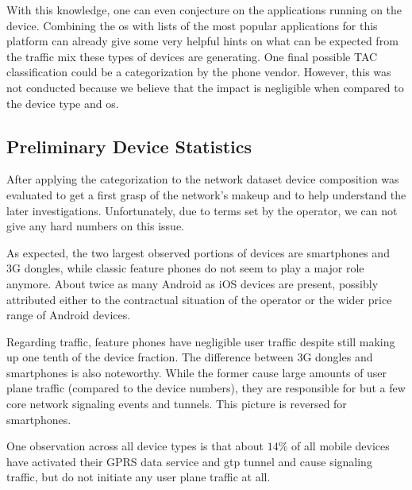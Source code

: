 With this knowledge, one can even conjecture on the applications running on the device. Combining the \gls{os} with lists of the most popular applications for this platform can already give some very helpful hints on what can be expected from the traffic mix these types of devices are generating. One final possible \gls{TAC} classification could be a categorization by the phone vendor. However, this was not conducted because we believe that the impact is negligible when compared to the device type and \gls{os}.


\subsection{Preliminary Device Statistics}

After applying the categorization to the network dataset device composition was evaluated to get a first grasp of the network's makeup and to help understand the later investigations. Unfortunately, due to terms set by the operator, we can not give any hard numbers on this issue.

As expected, the two largest observed portions of devices are smartphones and \gls{3G} dongles, while classic feature phones do not seem to play a major role anymore. About twice as many Android as iOS devices are present, possibly attributed either to the contractual situation of the operator or the wider price range of Android devices.

Regarding traffic, feature phones have negligible user traffic despite still making up one tenth of the device fraction. The difference between \gls{3G} dongles and smartphones is also noteworthy. While the former cause large amounts of user plane traffic (compared to the device numbers), they are responsible for but a few core network signaling events and tunnels. This picture is reversed for smartphones.

One observation across all device types is that about $14\%$ of all mobile devices have activated their \gls{GPRS} data service and \gls{gtp} tunnel and cause signaling traffic, but do not initiate any user plane traffic at all.




